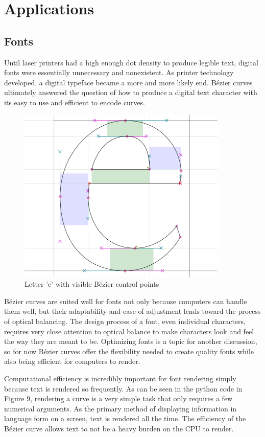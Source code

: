 \documentclass[12pt,letterpaper]{article}
\begin{document}
\section{Applications}

\subsection{Fonts}

Until laser printers had a high enough dot density to produce legible text, digital fonts were essentially unnecessary and nonexistent. As printer technology developed, a digital typeface became a more and more likely end. B\'ezier curves ultimately answered the question of how to produce a digital text character with its easy to use and efficient to encode curves.

\begin{figure}[H]
    \centering
    \includegraphics[width=10cm]{char}
    \caption{Letter 'e' with visible B\'ezier control points}
\end{figure}

B\'ezier curves are suited well for fonts not only because computers can handle them well, but their adaptability and ease of adjustment lends toward the process of optical balancing. The design process of a font, even individual characters, requires very close attention to optical balance to make characters look and feel the way they are meant to be. Optimizing fonts is a topic for another discussion, so for now B\'ezier curves offer the flexibility needed to create quality fonts while also being efficient for computers to render. 

Computational efficiency is incredibly important for font rendering simply because text is rendered so frequently. As can be seen in the python code in Figure 9, rendering a curve is a very simple task that only requires a few numerical arguments. As the primary method of displaying information in language form on a screen, text is rendered all the time. The efficiency of the B\'ezier curve allows text to not be a heavy burden on the CPU to render. 
\end{document}
